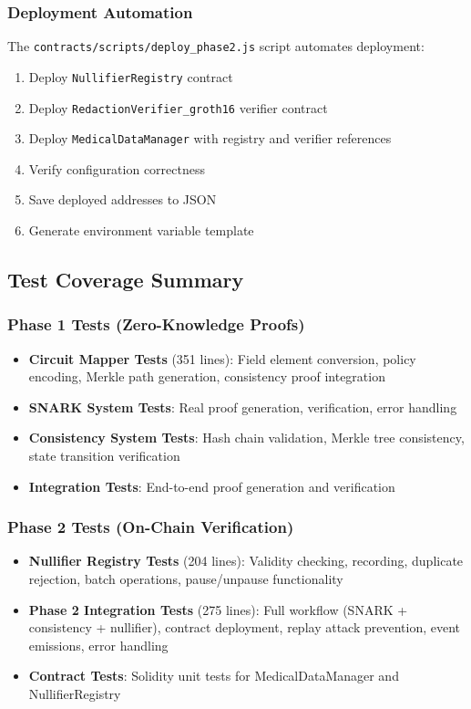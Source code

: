 \subsubsection{Deployment Automation}

The \texttt{contracts/scripts/deploy\_phase2.js} script automates deployment:

\begin{enumerate}
    \item Deploy \texttt{NullifierRegistry} contract
    \item Deploy \texttt{RedactionVerifier\_groth16} verifier contract
    \item Deploy \texttt{MedicalDataManager} with registry and verifier references
    \item Verify configuration correctness
    \item Save deployed addresses to JSON
    \item Generate environment variable template
\end{enumerate}

\subsection{Test Coverage Summary}

\subsubsection{Phase 1 Tests (Zero-Knowledge Proofs)}

\begin{itemize}
    \item \textbf{Circuit Mapper Tests} (351 lines): Field element conversion, policy encoding, Merkle path generation, consistency proof integration
    \item \textbf{SNARK System Tests}: Real proof generation, verification, error handling
    \item \textbf{Consistency System Tests}: Hash chain validation, Merkle tree consistency, state transition verification
    \item \textbf{Integration Tests}: End-to-end proof generation and verification
\end{itemize}

\subsubsection{Phase 2 Tests (On-Chain Verification)}

\begin{itemize}
    \item \textbf{Nullifier Registry Tests} (204 lines): Validity checking, recording, duplicate rejection, batch operations, pause/unpause functionality
    \item \textbf{Phase 2 Integration Tests} (275 lines): Full workflow (SNARK + consistency + nullifier), contract deployment, replay attack prevention, event emissions, error handling
    \item \textbf{Contract Tests}: Solidity unit tests for MedicalDataManager and NullifierRegistry
\end{itemize}


